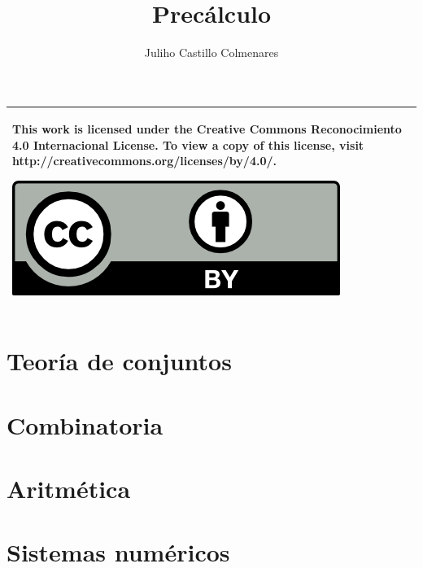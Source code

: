 \documentclass[
]{tufte-book}
\title{Precálculo}
\author{Juliho Castillo Colmenares}
\begin{document}
	\maketitle
\begin{tabular}{|p{}|}
	\hline
	This work is licensed under the Creative Commons Reconocimiento 4.0 Internacional License. To view a copy of this license, visit
	http://creativecommons.org/licenses/by/4.0/.
	\begin{center}
		\includegraphics[scale=1]{./licencia/by.png}
	\end{center}\\
	\hline
\end{tabular}
\tableofcontents

\chapter{Teoría de conjuntos}



 



 

\chapter{Combinatoria}







\chapter{Aritmética}







\chapter{Sistemas numéricos}




\end{document}

